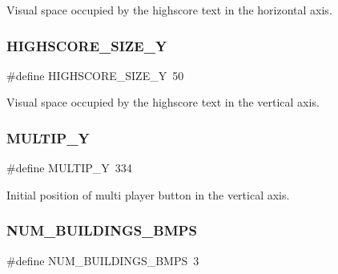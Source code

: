 Visual space occupied by the highscore text in the horizontal axis. 

\hypertarget{group___b_m_ps_holder_ga58bb49ecfe4e566c5c282e55faa900dc}{}\label{group___b_m_ps_holder_ga58bb49ecfe4e566c5c282e55faa900dc} 
\subsubsection{\texorpdfstring{H\+I\+G\+H\+S\+C\+O\+R\+E\+\_\+\+S\+I\+Z\+E\+\_\+Y}{HIGHSCORE\_SIZE\_Y}}
{\footnotesize\ttfamily \#define H\+I\+G\+H\+S\+C\+O\+R\+E\+\_\+\+S\+I\+Z\+E\+\_\+Y~50}



Visual space occupied by the highscore text in the vertical axis. 

\hypertarget{group___b_m_ps_holder_ga1d957cbc192cbdb76c80729a7a4e8781}{}\label{group___b_m_ps_holder_ga1d957cbc192cbdb76c80729a7a4e8781} 
\subsubsection{\texorpdfstring{M\+U\+L\+T\+I\+P\+\_\+Y}{MULTIP\_Y}}
{\footnotesize\ttfamily \#define M\+U\+L\+T\+I\+P\+\_\+Y~334}



Initial position of multi player button in the vertical axis. 

\hypertarget{group___b_m_ps_holder_ga879ee79215c5f7b42458ebd3e9258d9a}{}\label{group___b_m_ps_holder_ga879ee79215c5f7b42458ebd3e9258d9a} 
\subsubsection{\texorpdfstring{N\+U\+M\+\_\+\+B\+U\+I\+L\+D\+I\+N\+G\+S\+\_\+\+B\+M\+PS}{NUM\_BUILDINGS\_BMPS}}
{\footnotesize\ttfamily \#define N\+U\+M\+\_\+\+B\+U\+I\+L\+D\+I\+N\+G\+S\+\_\+\+B\+M\+PS~3}



